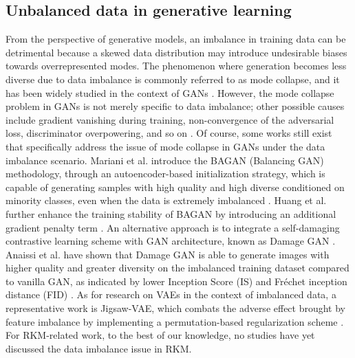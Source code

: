 \subsection{Unbalanced data in generative learning}
\label{subsec-ub-gen}
From the perspective of generative models, an imbalance in training data can be detrimental because a skewed data distribution may introduce undesirable biases towards overrepresented modes. The phenomenon where generation becomes less diverse due to data imbalance is commonly referred to as mode collapse, and it has been widely studied in the context of GANs \cite{goodfellowGenerativeAdversarialNets2014}. However, the mode collapse problem in GANs is not merely specific to data imbalance; other possible causes include gradient vanishing during training, non-convergence of the adversarial loss, discriminator overpowering, and so on \cite{kossaleModeCollapseGenerative2022}. Of course, some works still exist that specifically address the issue of mode collapse in GANs under the data imbalance scenario. Mariani et al. introduce the BAGAN (Balancing GAN) methodology, through an autoencoder-based initialization strategy, which is capable of generating samples with high quality and high diverse conditioned on minority classes, even when the data is extremely imbalanced \cite{marianiBAGANDataAugmentation2018}. Huang et al. further enhance the training stability of BAGAN by introducing an additional gradient penalty term \cite{huangEnhancedBalancingGAN2023}. An alternative approach is to integrate a self-damaging contrastive learning scheme with GAN architecture, known as Damage GAN \cite{anaissiDamageGANGenerative2024}. Anaissi et al. have shown that Damage GAN is able to generate images with higher quality and greater diversity on the imbalanced training dataset compared to vanilla GAN, as indicated by lower Inception Score (IS) and Fr\'{e}chet inception distance (FID) \cite{anaissiDamageGANGenerative2024}. As for research on VAEs in the context of imbalanced data, a representative work is Jigsaw-VAE, which combats the adverse effect brought by feature imbalance by implementing a permutation-based regularization scheme \cite{asgaritaghanakiJigsawVAEBalancingFeatures2020}. For RKM-related work, to the best of our knowledge, no studies have yet discussed the data imbalance issue in RKM.






